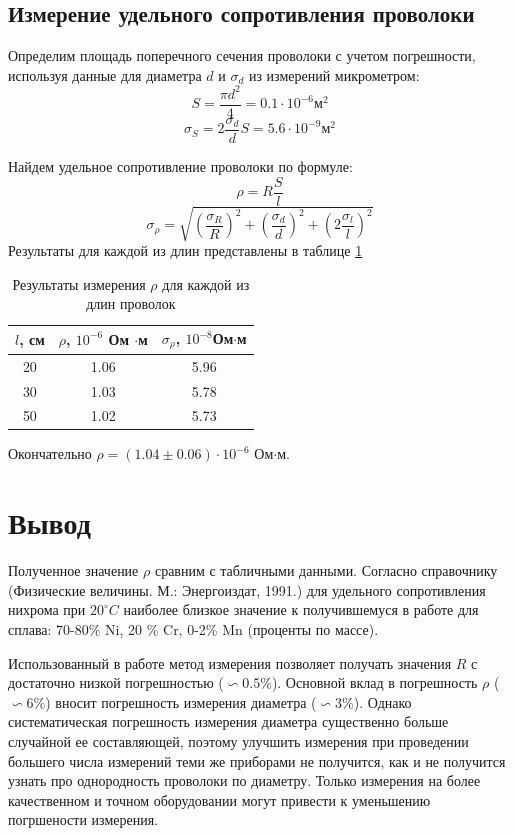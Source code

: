 \documentclass[a4paper,12pt]{article} %
\begin{document}
\subsection{Измерение удельного сопротивления проволоки}
Определим площадь поперечного сечения проволоки с учетом погрешности, используя данные для диаметра $d$ и $\sigma_d$ из измерений микрометром:
\begin{equation}
S = \frac{\pi d^2}{4}=0.1\cdot10^{-6}  \text{м}^2
\end{equation}
\begin{equation}
\sigma_S=2\frac{\sigma_d}{d}S=5.6\cdot10^{-9} \text{м}^2
\end{equation}

Найдем удельное сопротивление проволоки по формуле:
\begin{equation}
\rho = R\frac{S}{l}
\end{equation}
\begin{equation}
\sigma_{\rho} = \sqrt{\left( \frac{\sigma_R}{R} \right)^2+\left( \frac{\sigma_d}{d} \right)^2+\left(2 \frac{\sigma_l}{l} \right)^2}
\end{equation}
Результаты для каждой из длин представлены в таблице \ref{удсопрот}

\begin{table}
\caption{Результаты измерения $\rho$ для каждой из длин проволок}
\begin{tabular}{|c|c|c|}
\hline 
$l$, см & $\rho$, $10^{-6}$ Ом $\cdot$м &$\sigma_{\rho}$, $10^{-8}$Ом$\cdot$м \\ 
\hline 
20 & 1.06 & 5.96 \\ 
\hline 
30 & 1.03 & 5.78 \\ 
\hline 
50 & 1.02 & 5.73 \\ 
\hline 
\end{tabular} 
\label{удсопрот}
\end{table}
Окончательно $\rho = (1.04 \pm 0.06)\cdot 10^{-6}$ Ом$\cdot$м.
\section{Вывод}
Полученное значение $\rho$ сравним с табличными данными. Согласно справочнику (Физические величины. М.: Энергоиздат, 1991.) для удельного сопротивления нихрома при $20^{\circ}C$ наиболее близкое значение к получившемуся в работе для сплава: 70-80\% Ni, 20 \% Cr, 0-2\% Mn (проценты по массе).

Использованный в работе метод измерения позволяет получать значения $R$ с достаточно низкой погрешностью ($\backsim 0.5 \%$). Основной вклад в погрешность $\rho$ ($\backsim 6 \%$) вносит погрешность измерения диаметра ($\backsim 3 \%$). Однако систематическая погрешность измерения диаметра существенно больше случайной ее составляющей, поэтому улучшить измерения при проведении большего числа измерений теми же приборами не получится, как и не получится узнать про однородность проволоки по диаметру. Только измерения на более качественном и точном оборудовании могут привести к уменьшению погршености измерения.
\end{document}
